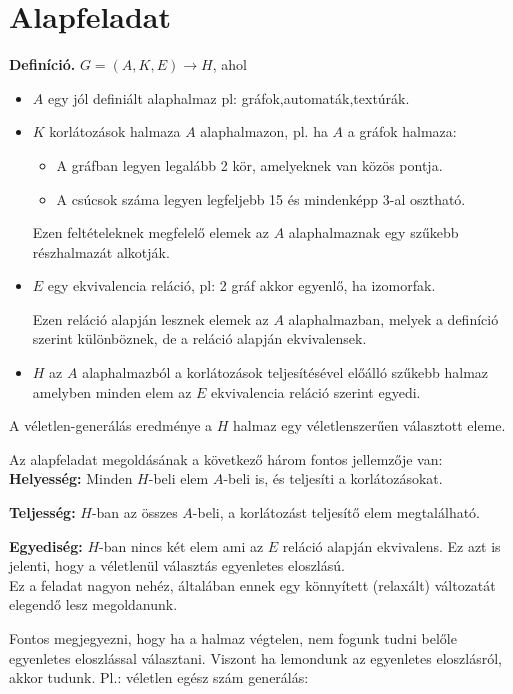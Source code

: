\documentclass[12pt]{report}
\theoremstyle{definition}
\begin{document}
\section{Alapfeladat}
\textbf{Definíció.} $G = (A,K,E)\rightarrow H$, ahol
\begin{itemize}
\item $A$ egy jól definiált alaphalmaz pl: gráfok,automaták,textúrák.

\item $K$ korlátozások halmaza $A$ alaphalmazon, pl. ha $A$ a gráfok halmaza:
\begin{itemize}
\item A gráfban legyen legalább 2 kör, amelyeknek van közös pontja.
\item A csúcsok száma legyen legfeljebb 15 és mindenképp 3-al osztható.
\end{itemize}
Ezen feltételeknek megfelelő elemek az $A$ alaphalmaznak egy szűkebb részhalmazát alkotják.

\item $E$ egy ekvivalencia reláció, pl: 2 gráf akkor egyenlő, ha izomorfak.

Ezen reláció alapján lesznek elemek az $A$ alaphalmazban, melyek a definíció szerint különböznek, de a reláció alapján ekvivalensek.

\item $H$ az $A$ alaphalmazból a korlátozások teljesítésével előálló szűkebb halmaz amelyben minden elem az $E$ ekvivalencia reláció szerint egyedi.
\end{itemize}

A véletlen-generálás eredménye a $H$ halmaz egy véletlenszerűen választott eleme.

Az alapfeladat megoldásának a következő három fontos jellemzője van:\\

\textbf{Helyesség:} Minden $H$-beli elem $A$-beli is, és teljesíti a korlátozásokat.

\textbf{Teljesség:} $H$-ban az összes $A$-beli, a korlátozást teljesítő elem megtalálható.

\textbf{Egyediség:} $H$-ban nincs két elem ami az $E$ reláció alapján ekvivalens. Ez azt is jelenti, hogy a véletlenül választás egyenletes eloszlású.\\

Ez a feladat nagyon nehéz, általában ennek egy könnyített (relaxált) változatát elegendő lesz megoldanunk.

Fontos megjegyezni, hogy ha a halmaz végtelen, nem fogunk tudni belőle egyenletes eloszlással választani. Viszont ha lemondunk az egyenletes eloszlásról, akkor tudunk. Pl.: véletlen egész szám generálás:
\end{document}
